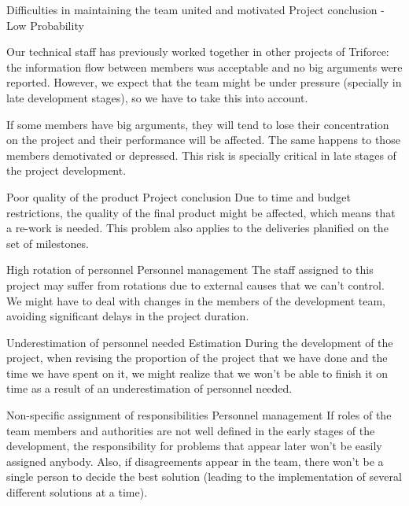 \begin{risk}{Difficulties in maintaining the team united and motivated}
\riskcat Project conclusion
 - Low Probability 

Our technical staff has previously worked together in other projects of Triforce: the information flow between members was acceptable and no big arguments were reported. However, we expect that the team might be under pressure (specially in late development stages), so we have to take this into account.

If some members have big arguments, they will tend to lose their concentration on the project and their performance will be affected. The same happens to those members demotivated or depressed. This risk is specially critical in late stages of the project development.
\end{risk}

\begin{risk}{Poor quality of the product}
\riskcat Project conclusion
\riskdesc Due to time and budget restrictions, the quality of the final product might be affected, which means that a re-work is needed. This problem also applies to the deliveries planified on the set of milestones.
\end{risk}

\begin{risk}{High rotation of personnel}
\riskcat Personnel management
\riskdesc The staff assigned to this project may suffer from rotations due to external causes that we can't control. We might have to deal with changes in the members of the development team, avoiding significant delays in the project duration.
\end{risk}

\begin{risk}{Underestimation of personnel needed}
\riskcat Estimation
\riskdesc During the development of the project, when revising the proportion of the project that we have done and the time we have spent on it, we might realize that we won't be able to finish it on time as a result of an underestimation of personnel needed. 
\end{risk}

\begin{risk}{Non-specific assignment of responsibilities}
\riskcat Personnel management
\riskdesc If roles of the team members and authorities are not well defined in the early stages of the development, the responsibility for problems that appear later won't be easily assigned anybody. Also, if disagreements appear in the team, there won't be a single person to decide the best solution (leading to the implementation of several different solutions at a time).
\end{risk}

